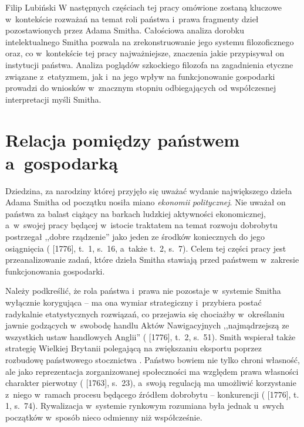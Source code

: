 \begin{artplenv}{Filip Lubiński}
W następnych częściach tej pracy omówione zostaną kluczowe w~kontekście rozważań na temat roli państwa i~prawa
fragmenty dzieł pozostawionych przez Adama Smitha. Całościowa analiza dorobku intelektualnego Smitha pozwala na
zrekonstruowanie jego systemu filozoficznego oraz, co w~kontekście tej pracy najważniejsze, znaczenia jakie przypisywał
on instytucji państwa. Analiza poglądów szkockiego filozofa na zagadnienia etyczne związane z~etatyzmem, jak i~na jego
wpływ na funkcjonowanie gospodarki prowadzi do wniosków w~znacznym stopniu odbiegających od współczesnej interpretacji
myśli Smitha.

\section{Relacja pomiędzy państwem a~gospodarką}
Dziedzina, za narodziny której przyjęło się uważać wydanie największego dzieła Adama Smitha od początku nosiła miano
\textit{ekonomii} \textit{politycznej}. Nie uważał on państwa za balast ciążący na barkach ludzkiej aktywności
ekonomicznej, a~w~swojej pracy będącej w~istocie traktatem na temat rozwoju dobrobytu postrzegał ,,dobre rządzenie'' jako
jeden ze środków koniecznych do jego osiągnięcia
(\cite{smith_badania_2007} [1776], t.~1, s.~16, a~także t.~2, s.~7).
Celem tej części pracy jest przeanalizowanie zadań, które dzieła Smitha stawiają przed państwem w~zakresie
funkcjonowania gospodarki.

Należy podkreślić, że rola państwa i~prawa nie pozostaje w~systemie Smitha wyłącznie korygująca -- ma ona wymiar
strategiczny i~przybiera postać radykalnie etatystycznych rozwiązań, co przejawia się chociażby w~określaniu jawnie
godzących w~swobodę handlu Aktów Nawigacyjnych ,,najmądrzejszą ze wszystkich ustaw handlowych Anglii''
(\cite{smith_badania_2007} [1776], t.~2, s.~51).
Smith wspierał także strategię Wielkiej Brytanii polegającą
na zwiększaniu eksportu poprzez rozbudowę państwowego stocznictwa
\parencite[s.~185–186]{beattie_false_2010}.
Państwo bowiem nie tylko chroni własność, ale jako reprezentacja zorganizowanej społeczności ma względem prawa
własności charakter pierwotny
(\cite{smith_lectures_1982} [1763], s.~23),
a~swoją regulacją ma umożliwić
korzystanie z~niego w~ramach procesu będącego źródłem dobrobytu -- konkurencji
(\cite{smith_badania_2007} [1776], t. 1, s.~74).
Rywalizacja w~systemie rynkowym rozumiana była jednak u~swych początków w~sposób nieco odmienny
niż współcześnie.


\end{artplenv}
